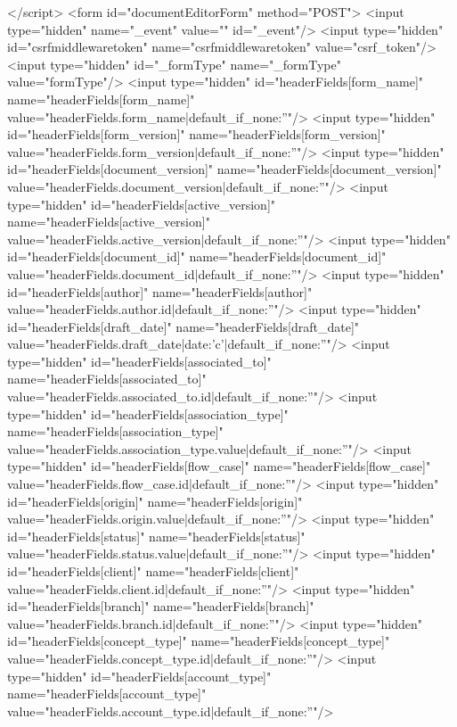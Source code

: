 {{{{{{{{{{{{{{{{{{{{{{</script>
  <form id="documentEditorForm" method="POST">
    <input type="hidden" name="_event" value="" id="_event"/>
    <input type="hidden" id="csrfmiddlewaretoken" name="csrfmiddlewaretoken" value="{{csrf_token}}"/>
    <input type="hidden" id="_formType" name="_formType" value="{{formType}}"/>
    <input type="hidden" id="headerFields[form_name]" name="headerFields[form_name]" value="{{headerFields.form_name|default_if_none:''}}"/>
    <input type="hidden" id="headerFields[form_version]" name="headerFields[form_version]" value="{{headerFields.form_version|default_if_none:''}}"/>
    <input type="hidden" id="headerFields[document_version]" name="headerFields[document_version]" value="{{headerFields.document_version|default_if_none:''}}"/>
    <input type="hidden" id="headerFields[active_version]" name="headerFields[active_version]" value="{{headerFields.active_version|default_if_none:''}}"/>
    <input type="hidden" id="headerFields[document_id]" name="headerFields[document_id]" value="{{headerFields.document_id|default_if_none:''}}"/>
    <input type="hidden" id="headerFields[author]" name="headerFields[author]" value="{{headerFields.author.id|default_if_none:''}}"/>
    <input type="hidden" id="headerFields[draft_date]" name="headerFields[draft_date]" value="{{headerFields.draft_date|date:'c'|default_if_none:''}}"/>
    <input type="hidden" id="headerFields[associated_to]" name="headerFields[associated_to]" value="{{headerFields.associated_to.id|default_if_none:''}}"/>
    <input type="hidden" id="headerFields[association_type]" name="headerFields[association_type]" value="{{headerFields.association_type.value|default_if_none:''}}"/>
    <input type="hidden" id="headerFields[flow_case]" name="headerFields[flow_case]" value="{{headerFields.flow_case.id|default_if_none:''}}"/>
    <input type="hidden" id="headerFields[origin]" name="headerFields[origin]" value="{{headerFields.origin.value|default_if_none:''}}"/>
    <input type="hidden" id="headerFields[status]" name="headerFields[status]" value="{{headerFields.status.value|default_if_none:''}}"/>
    <input type="hidden" id="headerFields[client]" name="headerFields[client]" value="{{headerFields.client.id|default_if_none:''}}"/>
    <input type="hidden" id="headerFields[branch]" name="headerFields[branch]" value="{{headerFields.branch.id|default_if_none:''}}"/>
    <input type="hidden" id="headerFields[concept_type]" name="headerFields[concept_type]" value="{{headerFields.concept_type.id|default_if_none:''}}"/>
    <input type="hidden" id="headerFields[account_type]" name="headerFields[account_type]" value="{{headerFields.account_type.id|default_if_none:''}}"/>
}}}}}}}}}}}}}}}}}}}}}}
